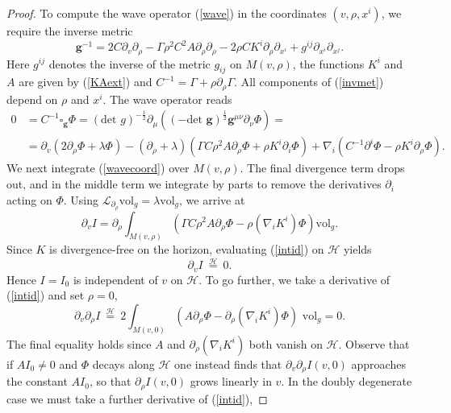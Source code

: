 \documentclass[10pt,a4paper]{amsart}
\begin{document}
\begin{proof}
To compute the wave operator (\ref{wave}) in the coordinates $(v,\rho,x^i)$, we require the inverse metric
\begin{equation} \label{invmet}
    \textbf{g}^{-1} = 2C\partial_v\partial_\rho - \Gamma\rho^2C^{2}A\partial_\rho\partial_\rho -2\rho CK^i\partial_\rho\partial_{x^i} + g^{ij}\partial_{x^i}\partial_{x^j}.
\end{equation}
Here $g^{ij}$ denotes the inverse of the metric $g_{ij}$ on $M(v,\rho)$, the functions $K^i$ and $A$ are given by (\ref{KAext}) and $C^{-1} = \Gamma + \rho\partial_\rho\Gamma$.
All components of (\ref{invmet}) depend on $\rho$ and $x^i$. The wave operator reads
\begin{align}\label{wavecoord}
    0 &= C^{-1}\square_{\textbf{g}}\Phi = (\text{det } g)^{-\frac 12}\partial_\mu((-\text{det }\textbf{g})^{\frac 12}\textbf{g}^{\mu\nu}\partial_\nu\Phi) = \nonumber\\&= \partial_v(2\partial_\rho\Phi + \lambda \Phi) - (\partial_\rho + \lambda)(\Gamma C\rho^2 A\partial_\rho\Phi + \rho K^i\partial_i\Phi) + \nabla_i(C^{-1}\partial^i\Phi - \rho K^i\partial_\rho \Phi).
\end{align}
We next integrate (\ref{wavecoord}) over $M(v,\rho)$. The final divergence term drops out, and in the middle term we integrate by parts to remove the derivatives $\partial_i$ acting on $\Phi$. Using $\mathcal{L}_{\partial_\rho}\text{vol}_g = \lambda\text{vol}_g$, we arrive at
\begin{equation} \label{intid}
    \partial_v I = \partial_\rho \int_{M(v,\rho)}\left(\Gamma C\rho^2A\partial_\rho \Phi -\rho (\nabla_i K^i)\Phi \right)\text{vol}_g.
\end{equation}
Since $K$ is divergence-free on the horizon, evaluating (\ref{intid}) on $\mathcal{H}$ yields
\begin{equation} \label{Ivr0}
    \partial_v I \:\overset{\mathcal{H}}{=}\:0.
\end{equation}
Hence $I = I_0$ is independent of $v$ on $\mathcal{H}$. To go further, we take a derivative of (\ref{intid}) and set $\rho = 0$,
\begin{equation}
    \partial_v \partial_\rho I \:\overset{\mathcal{H}}{=}\: 2\int_{M(v,0)}\left(A\partial_\rho\Phi - \partial_\rho(\nabla_i K^i)\Phi\right)\text{ vol}_g = 0. \label{Ivr1}
\end{equation}
The final equality holds since $A$ and $\partial_\rho(\nabla_i K^i)$ both vanish on $\mathcal{H}$. Observe that if $AI_0 \neq 0$ and $\Phi$ decays along $\mathcal{H}$ one instead finds that $\partial_v\partial_\rho I(v,0)$ approaches the constant $AI_0$, so that $\partial_\rho I(v,0)$ grows linearly in $v$. In the doubly degenerate case we must take a further derivative of (\ref{intid}),

\end{proof}
\end{document}
